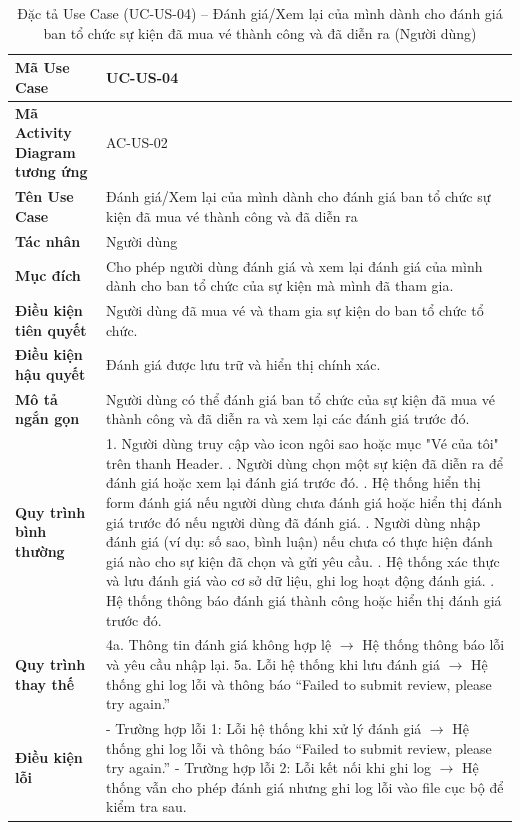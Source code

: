 \renewcommand{\arraystretch}{1.3}
\setlength{\tabcolsep}{4pt}
\begin{longtable}{|p{}|p{}|}
\caption{Đặc tả Use Case (UC-US-04) -- Đánh giá/Xem lại của mình dành cho đánh giá ban tổ chức sự kiện đã mua vé thành công và đã diễn ra (Người dùng) }\label{tab:uc_review_organizer_user}\\
\hline
\textbf{Mã Use Case} & UC-US-04 \\ \hline
\textbf{Mã Activity Diagram tương ứng} & AC-US-02 \\ \hline
\textbf{Tên Use Case} & Đánh giá/Xem lại của mình dành cho đánh giá ban tổ chức sự kiện đã mua vé thành công và đã diễn ra \\ \hline
\textbf{Tác nhân} & Người dùng \\ \hline
\textbf{Mục đích} & Cho phép người dùng đánh giá và xem lại đánh giá của mình dành cho ban tổ chức của sự kiện mà mình đã tham gia. \\ \hline
\textbf{Điều kiện tiên quyết} & Người dùng đã mua vé và tham gia sự kiện do ban tổ chức tổ chức. \\ \hline
\textbf{Điều kiện hậu quyết} & Đánh giá được lưu trữ và hiển thị chính xác. \\ \hline
\textbf{Mô tả ngắn gọn} & Người dùng có thể đánh giá ban tổ chức của sự kiện đã mua vé thành công và đã diễn ra và xem lại các đánh giá trước đó. \\ \hline
\textbf{Quy trình bình thường} &
1. Người dùng truy cập vào icon ngôi sao hoặc mục "Vé của tôi" trên thanh Header. \newline
2. Người dùng chọn một sự kiện đã diễn ra để đánh giá hoặc xem lại đánh giá trước đó. \newline
3. Hệ thống hiển thị form đánh giá nếu người dùng chưa đánh giá hoặc hiển thị đánh giá trước đó nếu người dùng đã đánh giá. \newline    
4. Người dùng nhập đánh giá (ví dụ: số sao, bình luận) nếu chưa có thực hiện đánh giá nào cho sự kiện đã chọn và gửi yêu cầu. \newline
5. Hệ thống xác thực và lưu đánh giá vào cơ sở dữ liệu, ghi log hoạt động đánh giá. \newline
6. Hệ thống thông báo đánh giá thành công hoặc hiển thị đánh giá trước đó. \\ \hline
\textbf{Quy trình thay thế} &
4a. Thông tin đánh giá không hợp lệ $\rightarrow$ Hệ thống thông báo lỗi và yêu cầu nhập lại. \newline
5a. Lỗi hệ thống khi lưu đánh giá $\rightarrow$ Hệ thống ghi log lỗi và thông báo “Failed to submit review, please try again.” \\ \hline
\textbf{Điều kiện lỗi} &
- Trường hợp lỗi 1: Lỗi hệ thống khi xử lý đánh giá $\rightarrow$ Hệ thống ghi log lỗi và thông báo “Failed to submit review, please try again.” \newline
- Trường hợp lỗi 2: Lỗi kết nối khi ghi log $\rightarrow$ Hệ thống vẫn cho phép đánh giá nhưng ghi log lỗi vào file cục bộ để kiểm tra sau. \\ \hline
\end{longtable}

